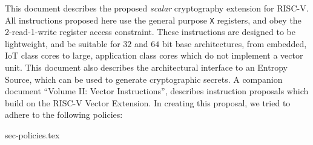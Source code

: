 
This document describes the proposed {\em scalar} cryptography
extension for RISC-V.
All instructions proposed here use the general purpose {\tt X}
registers, and obey the 2-read-1-write register access constraint.
These instructions are designed to be lightweight, and be suitable
for $32$ and $64$ bit base architectures, from embedded, IoT class
cores to large, application class cores which do not implement a
vector unit.
This document also describes the architectural interface to an
Entropy Source, which can be used to generate cryptographic secrets.
A companion document ``Volume II: Vector Instructions'', describes
instruction proposals which build on the RISC-V Vector Extension.
In creating this proposal, we tried to adhere to the following
policies:

{sec-policies.tex}
